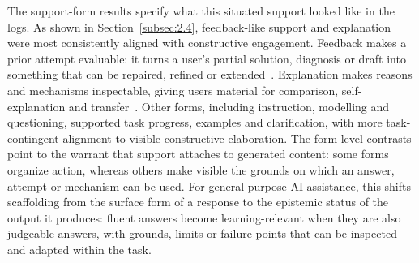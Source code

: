 The support-form results specify what this situated support looked like in the logs. As shown in Section~\ref{subsec:2.4}, feedback-like support and explanation were most consistently aligned with constructive engagement. Feedback makes a prior attempt evaluable: it turns a user's partial solution, diagnosis or draft into something that can be repaired, refined or extended~\cite{hattie2007power,shute2008focus,yin2025chatbotfeedback}. Explanation makes reasons and mechanisms inspectable, giving users material for comparison, self-explanation and transfer~\cite{chi1989self,renkl1997learning}. Other forms, including instruction, modelling and questioning, supported task progress, examples and clarification, with more task-contingent alignment to visible constructive elaboration. The form-level contrasts point to the warrant that support attaches to generated content: some forms organize action, whereas others make visible the grounds on which an answer, attempt or mechanism can be used. For general-purpose AI assistance, this shifts scaffolding from the surface form of a response to the epistemic status of the output it produces: fluent answers become learning-relevant when they are also judgeable answers, with grounds, limits or failure points that can be inspected and adapted within the task.





